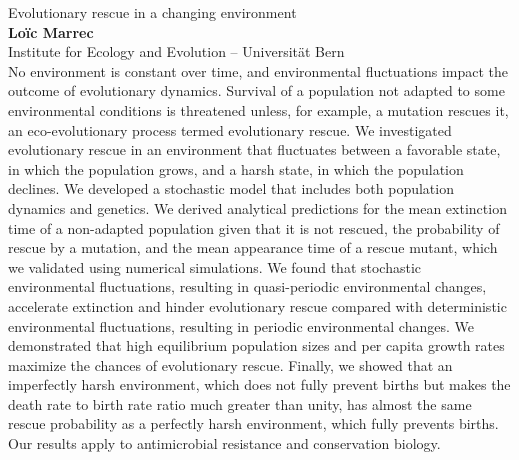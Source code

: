 \documentclass[12pt,a4paper]{article}
\begin{document}
\bigskip
\bigskip


{\Large  
Evolutionary rescue in a changing environment}\\[1ex]
{\large 
\textbf{Loïc Marrec}\\[1ex] Institute for Ecology and Evolution -- Universität Bern}\\[2ex]

No environment is constant over time, and environmental fluctuations impact the outcome of evolutionary dynamics. Survival of a population not adapted to some environmental conditions is threatened unless, for example, a mutation rescues it, an eco-evolutionary process termed evolutionary rescue.  We investigated evolutionary rescue in an environment that fluctuates
between a favorable state, in which the population grows, and a harsh state, in which the population declines. We developed a stochastic model that includes both population dynamics and genetics. We derived analytical predictions for the mean extinction time of a non-adapted population given that it is not rescued, the probability of rescue by a mutation, and the mean appearance time of a rescue mutant, which we validated using numerical simulations. We found that stochastic environmental fluctuations, resulting in quasi-periodic environmental changes, accelerate extinction and hinder evolutionary rescue compared with deterministic environmental fluctuations, resulting in periodic environmental changes. We demonstrated that high equilibrium population sizes and per capita growth rates maximize the chances of evolutionary rescue. Finally, we showed that an imperfectly harsh environment, which does not fully prevent births but makes the death rate to birth rate ratio much greater than unity, has almost the same rescue probability as a perfectly harsh environment, which fully prevents births. Our results apply to antimicrobial resistance and conservation biology. 


\bigskip \bigskip  %
\end{document}
